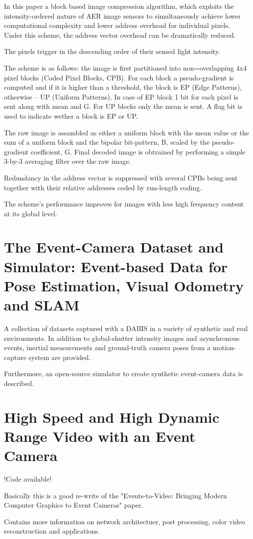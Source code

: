 \documentclass[10pt,a4paper]{article}
\begin{document}
In this paper a block based image compression algorithm, which exploits the intensity-ordered nature of AER image sensors to simultaneously achieve lower computational complexity and lower address overhead for individual pixels.
Under this scheme, the address vector overhead can be dramatically reduced.

The pixels trigger in the descending order of their sensed light intensity.

The scheme is as follows:
the image is first partitioned into non=overlapping 4x4 pixel blocks (Coded Pixel Blocks, CPB).
For each block a pseudo-gradient is computed and if it is higher than a threshold, the block is EP (Edge Patterns), otherwise -- UP (Uniform Patterns).
In case of EP block 1 bit for each pixel is sent along with mean and G.
For UP blocks only the mean is sent. A flag bit is used to indicate wether a block is EP or UP.

The raw image is assambled as either a uniform block with the mean value or the sum of a uniform block and the bipolar bit-pattern, B, scaled by the pseudo-gradient coefficient, G. Final decoded image is obtrained by performing a simple 3-by-3 averaging filter over the raw image.

Redundancy in the address vector is suppressed with several CPBs being sent together with their relative addresses coded by run-length coding.

The scheme's performance improves for images with less high frequency content at its global level.

\section{The Event-Camera Dataset and Simulator: Event-based Data for Pose Estimation, Visual Odometry and SLAM}
A collection of datasets captured with a DABIS in a variety of synthetic and real environments. 
In addition to global-shutter intensity images and asynchronous events, inertial measurements and ground-truth camera poses from a motion-capture system are provided.

Furthermore, an open-source simulator to create synthetic event-camera data is described.

\section{High Speed and High Dynamic Range Video with an Event Camera}
!Code available!

Basically this is a good re-write of the "Events-to-Video: Bringing Modern Computer Graphics to Event Cameras" paper.

Contains more information on network architectuer, post processing, color video reconstruction and applications.
\end{document}

